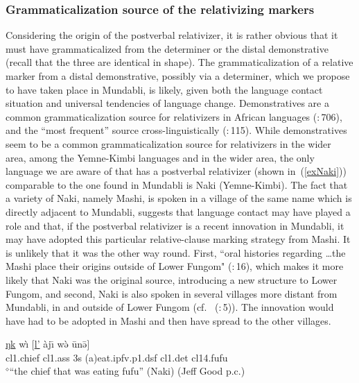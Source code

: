 \documentclass[10pt,twoside]{article}
\makeatletter
\newcommand{\cl}[1]{{\sc cl#1}}
\newcommand{\citepage}[2]{\citeauthor{#1}~{(\citeyear{#1}:\,{#2})}}
\newcommand{\citepp}[2]{(\citealp{#1}:\,{#2})}
\newcommand{\pref}[1]{(\ref{#1})}
\def\elicited{$^\diamond$}
\newcommand\MH{\texthighrise}
\renewcommand{\i}{ı}
\def\@{ə}
\def\ng{ŋ}
\makeatother
\begin{document}
\subsubsection{Grammaticalization source of the relativizing markers}\label{secMundabliGsource}
Considering the origin of the postverbal relativizer, it is rather obvious that it must have grammaticalized 
from the determiner or the distal demonstrative (recall that the three are identical in shape). The 
grammaticalization of a relative marker from a distal demonstrative, possibly via a determiner,
which we propose to have taken place in Mundabli, is likely, given both the language contact situation 
and universal tendencies of language change.
Demonstratives are a common grammaticalization source for relativizers in African 
languages \citepp{heine:2011}{706}, and the ``most frequent'' source cross-linguistically \citepp{heine:2002}{115}. 
While demonstratives seem to be a common grammaticalization source for relativizers in the wider area, among the 
Yemne-Kimbi languages and in the wider area, the only language we are aware of that has a postverbal relativizer (shown in~\pref{exNaki}) comparable to the one found in Mundabli is Naki (Yemne-Kimbi). The fact that a variety of Naki, 
namely Mashi, is spoken in a village of the same name which is directly adjacent to Mundabli, 
suggests that language contact may have played a role and that, if the postverbal relativizer is
a recent innovation in Mundabli, it may have adopted this particular relative-clause marking strategy from Mashi. 
It is unlikely that it was the other way round. First, ``oral histories regarding \dots the Mashi place their origins outside of Lower Fungom" \citepp{ideologies}{16}, which makes it more likely that Naki was the original source, introducing a new structure to Lower Fungom, and second, Naki is also spoken in several villages more distant from Mundabli, in and outside of Lower Fungom (cf. \citepage{ideologies}{5}). The innovation would have had to be adopted in Mashi and then have spread to the other villages.
\begin{exe}
\ex \label{exNaki}
\gll \uline{{\ng}k\MH{u}{\ng}} w{\`\i} $[$\uline{l'} \`aj{\=\i} w{\`\@} \=un{\=\@}$]$	\\
\cl1.chief \cl1.{\sc ass} 3s ({\sc a})eat.{\sc ipfv.p1.dsf} \cl1.{\sc det} \cl14.fufu	\\
\glt  \elicited ``the chief that was eating fufu'' (Naki) (Jeff Good p.c.)
\end{exe}
\end{document}

